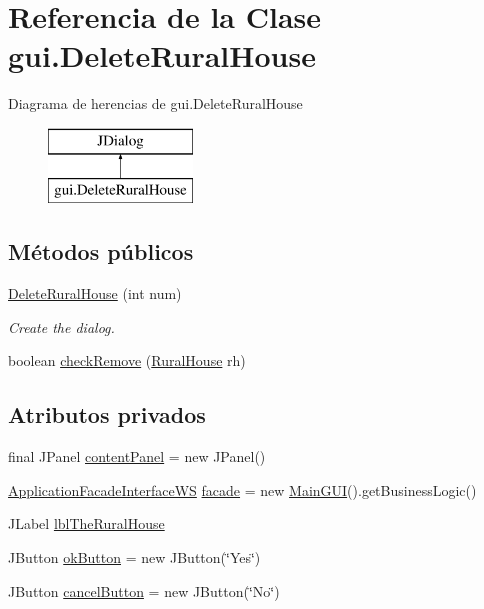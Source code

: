 \hypertarget{classgui_1_1_delete_rural_house}{}\section{Referencia de la Clase gui.\+Delete\+Rural\+House}
\label{classgui_1_1_delete_rural_house}
Diagrama de herencias de gui.\+Delete\+Rural\+House\begin{figure}[H]
\begin{center}
\leavevmode
\includegraphics[height=2.000000cm]{classgui_1_1_delete_rural_house}
\end{center}
\end{figure}
\subsection*{Métodos públicos}
\begin{DoxyCompactItemize}
\item 
\mbox{\hyperlink{classgui_1_1_delete_rural_house_a0de5d3d33aae7cd4d03aedd0f0fdf6c5}{Delete\+Rural\+House}} (int num)
\begin{DoxyCompactList}\small\item\em Create the dialog. \end{DoxyCompactList}\item 
boolean \mbox{\hyperlink{classgui_1_1_delete_rural_house_a3bcff9d21c59de14bd34daf687af6141}{check\+Remove}} (\mbox{\hyperlink{classdomain_1_1_rural_house}{Rural\+House}} rh)
\end{DoxyCompactItemize}
\subsection*{Atributos privados}
\begin{DoxyCompactItemize}
\item 
final J\+Panel \mbox{\hyperlink{classgui_1_1_delete_rural_house_abca92167d065908e2825a0051315c5fa}{content\+Panel}} = new J\+Panel()
\item 
\mbox{\hyperlink{interfacebusiness_logic_1_1_application_facade_interface_w_s}{Application\+Facade\+Interface\+WS}} \mbox{\hyperlink{classgui_1_1_delete_rural_house_ad446803b49fe41357f91279c46854c61}{facade}} = new \mbox{\hyperlink{classgui_1_1_main_g_u_i}{Main\+G\+UI}}().get\+Business\+Logic()
\item 
J\+Label \mbox{\hyperlink{classgui_1_1_delete_rural_house_ac96583ac0943e616bba9d5f39b56f10a}{lbl\+The\+Rural\+House}}
\item 
J\+Button \mbox{\hyperlink{classgui_1_1_delete_rural_house_af2cf09ba446789ead0469867ede22bc7}{ok\+Button}} = new J\+Button(\char`\"{}Yes\char`\"{})
\item 
J\+Button \mbox{\hyperlink{classgui_1_1_delete_rural_house_a342b527007fadd1b9aed35227d31a57f}{cancel\+Button}} = new J\+Button(\char`\"{}No\char`\"{})
\end{DoxyCompactItemize}


